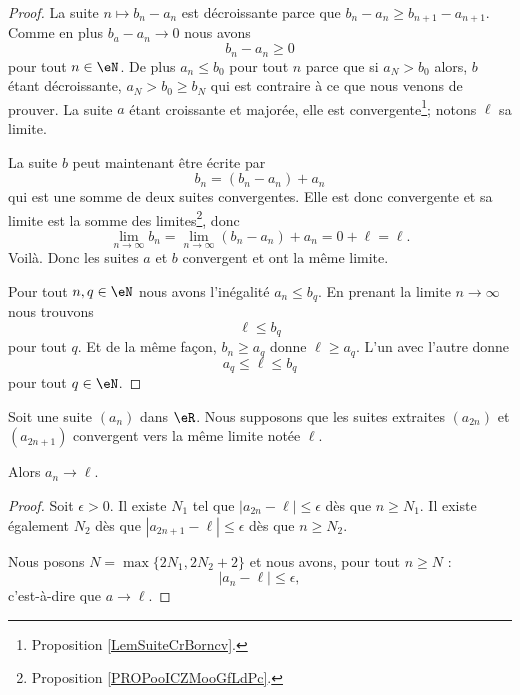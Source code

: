 \begin{proof}
    La suite \( n\mapsto b_n-a_n\) est décroissante parce que \( b_n-a_n\geq b_{n+1}-a_{n+1}\). Comme en plus \( b_a-a_n\to 0\) nous avons
    \begin{equation}
        b_n-a_n\geq 0
    \end{equation}
    pour tout \( n\in \eN\). De plus \( a_n\leq b_0\) pour tout \( n\) parce que si \( a_N>b_0\) alors, \( b\) étant décroissante, \( a_N>b_0\geq b_N\) qui est contraire à ce que nous venons de prouver. La suite \( a\) étant croissante et majorée, elle est convergente\footnote{Proposition \ref{LemSuiteCrBorncv}.}; notons \( \ell\) sa limite.

    La suite \( b\) peut maintenant être écrite par
    \begin{equation}
        b_n=(b_n-a_n)+a_n
    \end{equation}
    qui est une somme de deux suites convergentes. Elle est donc convergente et sa limite est la somme des limites\footnote{Proposition \ref{PROPooICZMooGfLdPc}.}, donc
    \begin{equation}
        \lim_{n\to \infty} b_n=\lim_{n\to \infty} (b_n-a_n)+a_n=0+\ell=\ell.
    \end{equation}
    Voilà. Donc les suites \( a\) et \( b\) convergent et ont la même limite.

    Pour tout \( n,q\in \eN\) nous avons l'inégalité \( a_n\leq b_q\). En prenant la limite \( n\to \infty\) nous trouvons
    \begin{equation}
        \ell\leq b_q
    \end{equation}
    pour tout \( q\). Et de la même façon, \( b_n\geq a_q\) donne \( \ell\geq a_q\). L'un avec l'autre donne
    \begin{equation}
        a_q\leq \ell\leq b_q
    \end{equation}
    pour tout \( q\in \eN\).
\end{proof}

\begin{proposition}      \label{PROPooXOOCooGMqJNe}
    Soit une suite \( (a_n)\) dans \( \eR\).  Nous supposons que les suites extraites \( (a_{2n})\) et \( (a_{2n+1})\) convergent vers la même limite notée \( \ell\).

    Alors \( a_n\to \ell\).
\end{proposition}

\begin{proof}
    Soit \( \epsilon>0\). Il existe \( N_1\) tel que \( | a_{2n}-\ell |\leq \epsilon\) dès que \( n\geq N_1\). Il existe également \( N_2\) dès que \( | a_{2n+1}-\ell |\leq \epsilon\) dès que \( n\geq N_2\).

    Nous posons \( N=\max\{ 2N_1,2N_2+2 \}\) et nous avons, pour tout \( n\geq N\) :
    \begin{equation}
        | a_n-\ell |\leq \epsilon,
    \end{equation}
    c'est-à-dire que \( a\to \ell\).
\end{proof}

